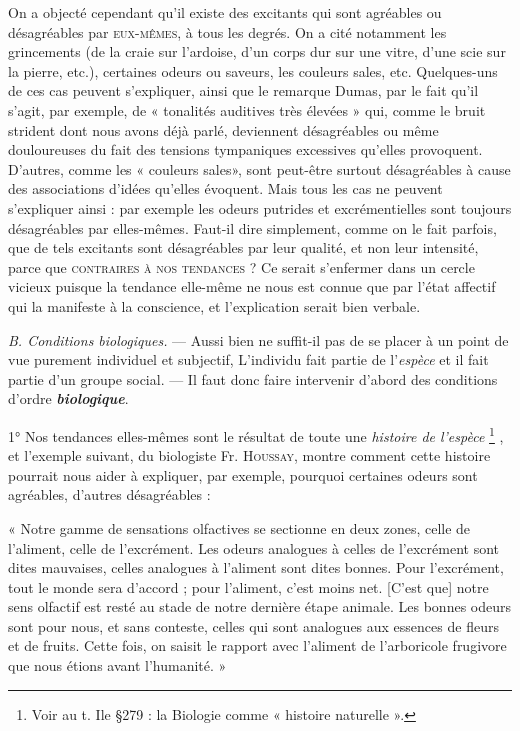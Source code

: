 {\footnotesize
On a objecté cependant qu'il existe des excitants qui sont agréables ou
désagréables par \textsc{eux-mêmes}, à tous les degrés. On a cité notamment les
grincements (de la craie sur l’ardoise, d'un corps dur sur une vitre, d’une
scie sur la pierre, etc.), certaines odeurs ou saveurs, les couleurs sales, etc.
Quelques-uns de ces cas peuvent s'expliquer, ainsi que le remarque Dumas,
par le fait qu'il s’agit, par exemple, de « tonalités auditives très élevées »
qui, comme le bruit strident dont nous avons déjà parlé, deviennent désagréables
ou même douloureuses du fait des tensions tympaniques excessives
qu’elles provoquent. D’autres, comme les « couleurs sales», sont peut-être
surtout désagréables à cause des associations d'idées qu'elles évoquent.
Mais tous les cas ne peuvent s'expliquer ainsi : par exemple les odeurs
putrides et excrémentielles sont toujours désagréables par elles-mêmes.
Faut-il dire simplement, comme on le fait parfois, que de tels excitants
sont désagréables par leur qualité, et non leur intensité, parce que \textsc{contraires
à nos tendances} ? Ce serait s’enfermer dans un cercle vicieux puisque la
tendance elle-même ne nous est connue que par l'état affectif qui la manifeste
à la conscience, et l'explication serait bien verbale.
}

{\it B. Conditions biologiques.} — Aussi bien ne suffit-il pas de se placer
à un point de vue purement individuel et subjectif, L’individu fait
partie de l'{\it espèce} et il fait partie d’un groupe social. — Il faut donc
faire intervenir d’abord des conditions d’ordre \textbf{\textit {biologique}}.

1° Nos tendances elles-mêmes sont le résultat de toute une {\it histoire
de l'espèce}
\footnote{Voir au t. Ile \S 279 : la Biologie comme « histoire naturelle ».}
, et l'exemple suivant, du biologiste Fr. \textsc{Houssay}, montre
comment cette histoire pourrait nous aider à expliquer, par exemple,
pourquoi certaines odeurs sont agréables, d’autres désagréables :

« Notre gamme de sensations olfactives se sectionne en deux zones, celle
de l’aliment, celle de l’excrément. Les odeurs analogues à celles de l’excrément
sont dites mauvaises, celles analogues à l’aliment sont dites bonnes.
Pour l’excrément, tout le monde sera d'accord ; pour l’aliment, c'est moins
net. [C'est que] notre sens olfactif est resté au stade de notre dernière
étape animale. Les bonnes odeurs sont pour nous, et sans conteste, celles
qui sont analogues aux essences de fleurs et de fruits. Cette fois, on saisit
le rapport avec l'aliment de l’arboricole frugivore que nous étions avant
l'humanité. »

